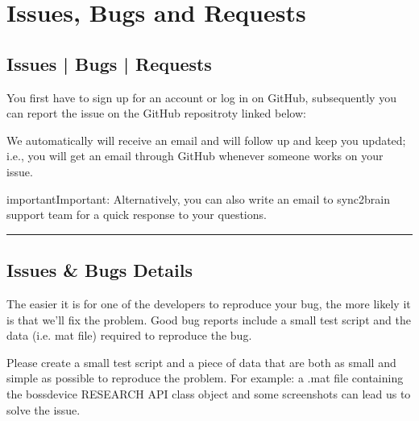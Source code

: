 \documentclass[letterpaper,10pt,english]{sphinxmanual}
\begin{document}
\chapter{Issues, Bugs and Requests}
\label{\detokenize{7_issues_bugs_requests:issues-bugs-and-requests}}\label{\detokenize{7_issues_bugs_requests::doc}}

\section{Issues | Bugs | Requests}
\label{\detokenize{7_issues_bugs_requests:issues-bugs-requests}}
\sphinxAtStartPar
You first have to sign up for an account or log in on GitHub, subsequently you can report the issue on the GitHub repositroty linked below:

\begin{sphinxVerbatim}[commandchars=\\\{\}]
\end{sphinxVerbatim}

\sphinxAtStartPar
We automatically will receive an email and will follow up and keep you updated; i.e., you will get an email through GitHub whenever someone works on your issue.

\begin{sphinxadmonition}{important}{Important:}
\sphinxAtStartPar
Alternatively, you can also write an email to sync2brain support team for a quick response to your questions.
\end{sphinxadmonition}


\bigskip\hrule\bigskip



\section{Issues \& Bugs Details}
\label{\detokenize{7_issues_bugs_requests:issues-bugs-details}}
\sphinxAtStartPar
The easier it is for one of the developers to reproduce your bug, the more likely it is that we’ll fix the problem. Good bug reports include a small test script and the data (i.e. mat file) required to reproduce the bug.

\sphinxAtStartPar
Please create a small test script and a piece of data that are both as small and simple as possible to reproduce the problem. For example: a .mat file containing the bossdevice RESEARCH API class object and some screenshots can lead us to solve the issue.
\end{document}
